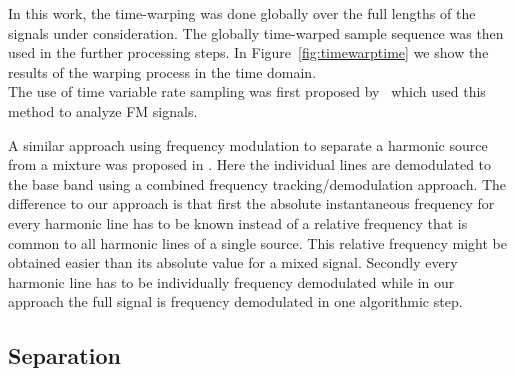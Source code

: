 In this work, the time-warping was done globally over the full lengths of the
signals under consideration. The globally time-warped sample sequence
was then used in the further processing steps. In Figure~\ref{fig:timewarptime} we show the results of the warping process in the time domain. \\

The use of time variable rate sampling was first proposed by~\cite{wulich92} which used this method to analyze FM signals.

A similar approach using frequency modulation to separate a harmonic
source from a mixture was proposed in \cite{wang95}. Here the
individual lines are demodulated to the base band using a combined frequency
tracking/demodulation approach. The difference to our approach is that first
the absolute instantaneous frequency for every harmonic line has to be known
instead of a relative frequency that is common to all harmonic lines of a single
source. This relative frequency might be obtained easier than its
absolute value for a mixed signal. Secondly every harmonic line has to be individually frequency demodulated while in our approach the full signal is frequency demodulated in one algorithmic step.\\

\subsection{Separation} %
\label{sub:pitch_variation_informed_source_separation}

